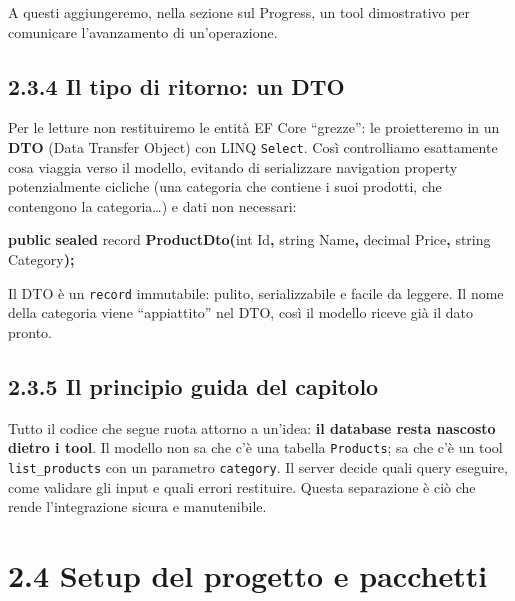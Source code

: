 \documentclass[
  italian,
  10pt,
]{book}
\newenvironment{Shaded}{\begin{snugshade}}{\end{snugshade}}
\newcommand{\DataTypeTok}[1]{\textcolor[rgb]{0.13,0.29,0.53}{#1}}
\newcommand{\FunctionTok}[1]{\textcolor[rgb]{0.13,0.29,0.53}{\textbf{#1}}}
\newcommand{\KeywordTok}[1]{\textcolor[rgb]{0.13,0.29,0.53}{\textbf{#1}}}
\newcommand{\NormalTok}[1]{#1}
\newcommand{\OperatorTok}[1]{\textcolor[rgb]{0.81,0.36,0.00}{\textbf{#1}}}
\begin{document}
A questi aggiungeremo, nella sezione sul Progress, un tool dimostrativo
per comunicare l'avanzamento di un'operazione.

\subsection{2.3.4 Il tipo di ritorno: un
DTO}\label{il-tipo-di-ritorno-un-dto}

Per le letture non restituiremo le entità EF Core ``grezze'': le
proietteremo in un \textbf{DTO} (Data Transfer Object) con LINQ
\texttt{Select}. Così controlliamo esattamente cosa viaggia verso il
modello, evitando di serializzare navigation property potenzialmente
cicliche (una categoria che contiene i suoi prodotti, che contengono la
categoria\ldots) e dati non necessari:

\begin{Shaded}
\begin{Highlighting}[]
\KeywordTok{public} \KeywordTok{sealed}\NormalTok{ record }\FunctionTok{ProductDto}\OperatorTok{(}\DataTypeTok{int}\NormalTok{ Id}\OperatorTok{,} \DataTypeTok{string}\NormalTok{ Name}\OperatorTok{,} \DataTypeTok{decimal}\NormalTok{ Price}\OperatorTok{,} \DataTypeTok{string}\NormalTok{ Category}\OperatorTok{);}
\end{Highlighting}
\end{Shaded}

Il DTO è un \texttt{record} immutabile: pulito, serializzabile e facile
da leggere. Il nome della categoria viene ``appiattito'' nel DTO, così
il modello riceve già il dato pronto.

\subsection{2.3.5 Il principio guida del
capitolo}\label{il-principio-guida-del-capitolo}

Tutto il codice che segue ruota attorno a un'idea: \textbf{il database
resta nascosto dietro i tool}. Il modello non sa che c'è una tabella
\texttt{Products}; sa che c'è un tool \texttt{list\_products} con un
parametro \texttt{category}. Il server decide quali query eseguire, come
validare gli input e quali errori restituire. Questa separazione è ciò
che rende l'integrazione sicura e manutenibile.

\section{2.4 Setup del progetto e
pacchetti}\label{setup-del-progetto-e-pacchetti}
\end{document}
